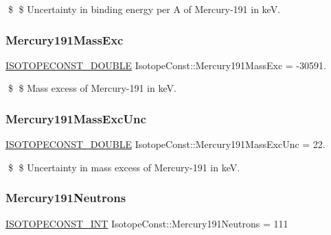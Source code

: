 \$ \$ Uncertainty in binding energy per A of Mercury-\/191 in keV. \mbox{\label{group___isotope_const-_mercury-_hg191_ga914822e904a1399f65fef501afe440ea}} 
\subsubsection{\texorpdfstring{Mercury191\+Mass\+Exc}{Mercury191MassExc}}
{\footnotesize\ttfamily \mbox{\hyperlink{group___isotope_const-_macros_ga8f45a7272ce02c0b4c65c44636ed719a}{I\+S\+O\+T\+O\+P\+E\+C\+O\+N\+S\+T\+\_\+\+D\+O\+U\+B\+LE}} Isotope\+Const\+::\+Mercury191\+Mass\+Exc = -\/30591.}

\$ \$ Mass excess of Mercury-\/191 in keV. \mbox{\label{group___isotope_const-_mercury-_hg191_ga65d48e38105d0b9be3ff397db5488a58}} 
\subsubsection{\texorpdfstring{Mercury191\+Mass\+Exc\+Unc}{Mercury191MassExcUnc}}
{\footnotesize\ttfamily \mbox{\hyperlink{group___isotope_const-_macros_ga8f45a7272ce02c0b4c65c44636ed719a}{I\+S\+O\+T\+O\+P\+E\+C\+O\+N\+S\+T\+\_\+\+D\+O\+U\+B\+LE}} Isotope\+Const\+::\+Mercury191\+Mass\+Exc\+Unc = 22.}

\$ \$ Uncertainty in mass excess of Mercury-\/191 in keV. \mbox{\label{group___isotope_const-_mercury-_hg191_ga82454e8815cd41784435cf0e2e05c0f9}} 
\subsubsection{\texorpdfstring{Mercury191\+Neutrons}{Mercury191Neutrons}}
{\footnotesize\ttfamily \mbox{\hyperlink{group___isotope_const-_macros_ga5f18360b3e99483a35c32d789e62621c}{I\+S\+O\+T\+O\+P\+E\+C\+O\+N\+S\+T\+\_\+\+I\+NT}} Isotope\+Const\+::\+Mercury191\+Neutrons = 111}

